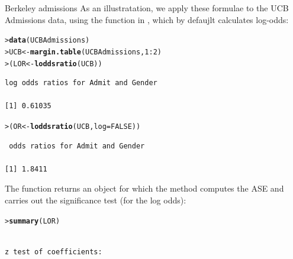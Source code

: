 \documentclass[10pt,krantz2]{krantz}\usepackage[]{graphicx}\usepackage[]{color}
\makeatletter
\newcommand{\hlnum}[1]{\textcolor[rgb]{0.686,0.059,0.569}{#1}}%
\newcommand{\hlopt}[1]{\textcolor[rgb]{0,0,0}{#1}}%
\newcommand{\hlstd}[1]{\textcolor[rgb]{0.345,0.345,0.345}{#1}}%
\newcommand{\hlkwb}[1]{\textcolor[rgb]{0.69,0.353,0.396}{#1}}%
\newcommand{\hlkwc}[1]{\textcolor[rgb]{0.333,0.667,0.333}{#1}}%
\newcommand{\hlkwd}[1]{\textcolor[rgb]{0.737,0.353,0.396}{\textbf{#1}}}%
\newenvironment{kframe}{%
 \def\at@end@of@kframe{}%
 \ifinner\ifhmode%
  \def\at@end@of@kframe{\end{minipage}}%
  \begin{minipage}{\columnwidth}%
 \fi\fi%
 \def\FrameCommand##1{\hskip\@totalleftmargin \hskip-\fboxsep
 \colorbox{shadecolor}{##1}\hskip-\fboxsep
     \hskip-\linewidth \hskip-\@totalleftmargin \hskip\columnwidth}%
 \MakeFramed {\advance\hsize-\width
   \@totalleftmargin\z@ \linewidth\hsize
   \@setminipage}}%
 {\par\unskip\endMakeFramed%
 \at@end@of@kframe}
\newenvironment{knitrout}{}{} %
\renewenvironment{knitrout}{\small\renewcommand{\baselinestretch}{.85}}{} %
\makeatother
\begin{document}
\begin{Example}[ucbadmissions]{Berkeley admissions}
As an illustratation, we apply these formulae to the UCB Admissions
data, using the  function in , which by
defaujlt calculates log-odds:
\begin{knitrout}
\color{fgcolor}\begin{kframe}
\begin{alltt}
\hlstd{> }\hlkwd{data}\hlstd{(UCBAdmissions)}
\hlstd{> }\hlstd{UCB} \hlkwb{<-} \hlkwd{margin.table}\hlstd{(UCBAdmissions,} \hlnum{1}\hlopt{:}\hlnum{2}\hlstd{)}
\hlstd{> }\hlstd{(LOR} \hlkwb{<-} \hlkwd{loddsratio}\hlstd{(UCB))}
\end{alltt}
\begin{verbatim}
log odds ratios for Admit and Gender 

[1] 0.61035
\end{verbatim}
\begin{alltt}
\hlstd{> }\hlstd{(OR} \hlkwb{<-} \hlkwd{loddsratio}\hlstd{(UCB,} \hlkwc{log} \hlstd{=} \hlnum{FALSE}\hlstd{))}
\end{alltt}
\begin{verbatim}
 odds ratios for Admit and Gender 

[1] 1.8411
\end{verbatim}
\end{kframe}
\end{knitrout}
\noindent The function returns an object for which the 
method computes the ASE and carries out the significance test (for the
log odds):
\begin{knitrout}
\color{fgcolor}\begin{kframe}
\begin{alltt}
\hlstd{> }\hlkwd{summary}\hlstd{(LOR)}
\end{alltt}
\begin{verbatim}

z test of coefficients:


\end{verbatim}
\end{kframe}
\end{knitrout}
\end{Example}
\end{document}
